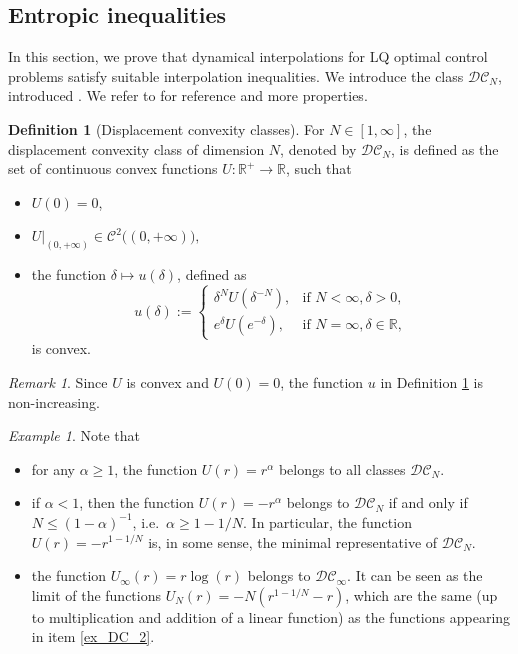 \documentclass[reqno]{amsart}
\theoremstyle{plain}
\theoremstyle{definition}
\newtheorem{Def}[thm]{Definition}
\theoremstyle{remark}
\newtheorem{exmp}[thm]{Example}
\newtheorem{rem}[thm]{Remark}
\begin{document}
                \subsection{Entropic inequalities}\label{entr_ineq}

In this section, we prove that dynamical interpolations for LQ optimal control problems satisfy suitable interpolation inequalities. We introduce the class $\mathcal{DC}_N$, introduced \cite{McCann1997ACP}. We refer to \cite[Chapter 17]{Villanioldandnew} for reference and more properties.

		\begin{Def}[Displacement convexity classes]\label{def:DCN}
			For $N\in[1,\infty]$, the displacement convexity class of dimension $N$, denoted by $\mathcal{DC}_N$, is defined as the set of continuous convex functions $U:\mathbb{R}^{+}\to\mathbb{R}$, such that 
			\begin{itemize}
				\item $U(0)=0$,
				\item $U|_{(0,+\infty)}\in\mathcal{C}^2\big((0,+\infty)\big),$
				\item the function $\delta\mapsto u(\delta)$, defined as
			 	\begin{equation}
			 		u(\delta):=\begin{cases}
			 			\delta^NU(\delta^{-N}), &\text{if }N<\infty,\delta>0,\\
			 			e^{\delta}U(e^{-\delta}), &\text{if }N=\infty,\delta\in\mathbb{R},
			 			\end{cases}
			 	\end{equation}
                is convex.
			\end{itemize}
		\end{Def}
		\begin{rem}\label{nonincreasing_u}
			Since $U$ is convex and $U(0)=0$, the function $u$ in Definition \ref{def:DCN} is  non-increasing.
		\end{rem}
		\begin{exmp}
			Note that 
			\begin{itemize}
				\item for any $\alpha\geq 1$, the function $U(r)=r^{\alpha}$ belongs to all classes $\mathcal{DC}_N$.
				\item \label{ex_DC_2} if $\alpha<1$, then the function $U(r)=-r^{\alpha}$ belongs to $\mathcal{DC}_N$ if and only if $N\leq (1-\alpha)^{-1}$, i.e.\ $\alpha\geq 1-1/N$. In particular, the function $U(r)=-r^{1-1/N}$ is, in some sense, the minimal representative of $\mathcal{DC}_N$.
				\item the function $U_{\infty}(r)=r\log(r)$ belongs to $\mathcal{DC}_{\infty}$. It can be seen as the limit of the functions $U_N(r)=-N(r^{1-1/N}-r)$, which are the same (up to multiplication and addition of a linear function) as the functions appearing in item \eqref{ex_DC_2}. 
			\end{itemize}
		\end{exmp}
\end{document}
